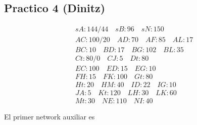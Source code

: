 \documentclass[a4paper]{article}
\begin{document}
\pagebreak 

\subsection{Practico 4 (Dinitz)}

\begin{align*}
&sA: 144/44 \quad sB: 96 \quad sN: 150 \\ 
&AC: 100 / 20 \quad AD: 70 \quad AF: 85 \quad AL: 17\\
&BC: 10 \quad BD :17 \quad BG :102 \quad BL: 35 \\
&Ct: 80/0 \quad CJ :5 \quad Dt: 80\\
&EC: 100 \quad ED: 15 \quad EG: 10\\
&FH: 15 \quad FK :100 \quad Gt: 80\\
&Ht: 20 \quad HM :40 \quad ID :22 \quad IG :10 \\
&JA: 5 \quad Kt :120 \quad LH :30 \quad LK :60 \\ 
&Mt: 30 \quad NE: 110 \quad NI: 40
\end{align*}


El primer network auxiliar es 
\end{document}
